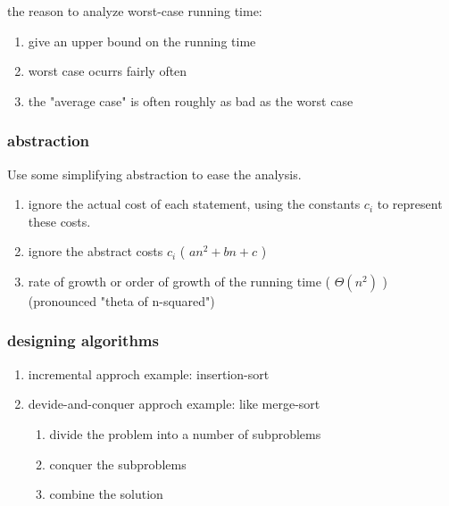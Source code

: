 \documentclass[11pt]{article}
\begin{document}
the reason to analyze worst-case running time: \\
\begin{enumerate}
\item give an upper bound on the running time \\
\item worst case ocurrs fairly often \\
\item the "average case" is often roughly as bad as the worst case \\
\end{enumerate}

\subsubsection{abstraction}
\label{sec-2-2-10}
Use some simplifying abstraction to ease the analysis. \\
\begin{enumerate}
\item ignore the actual cost of each statement, using the constants $c_i$ to represent these costs. \\
\item ignore the abstract costs $c_i$ ( $an^2 + bn + c$ ) \\
\item rate of growth or order of growth of the running time ( $\Theta(n^2)$ ) (pronounced "theta of n-squared") \\
\end{enumerate}


\subsubsection{designing algorithms}
\label{sec-2-2-11}
\begin{enumerate}
\item incremental approch
\label{sec-2-2-11-1}
example: insertion-sort \\
\item devide-and-conquer approch
\label{sec-2-2-11-2}
example: like merge-sort \\

\begin{enumerate}
\item divide the problem into a number of subproblems \\
\item conquer the subproblems \\
\item combine the solution \\
\end{enumerate}
\end{enumerate}
\end{document}
